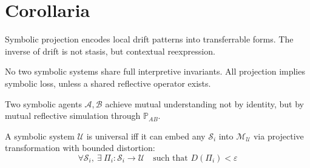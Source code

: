 \section*{Corollaria}
\label{sec:bk8_corollaria}
\begin{corollary}
\label{corollary:bk8_projective_drift}
Symbolic projection encodes local drift patterns into transferrable forms. The inverse of drift is not stasis, but contextual reexpression.
\end{corollary}
\begin{corollary}
\label{corollary:bk8_translation_limit}
No two symbolic systems share full interpretive invariants. All projection implies symbolic loss, unless a shared reflective operator exists.
\end{corollary}
\begin{corollary}
\label{corollary:bk8_resonant_cognition}
Two symbolic agents $\mathscr{A}, \mathscr{B}$ achieve mutual understanding not by identity, but by mutual reflective simulation through $\mathbb{P}_{AB}$.
\end{corollary}
\begin{corollary}
\label{corollary:bk8_universality_condition}
A symbolic system $\mathscr{U}$ is universal iff it can embed any $\mathscr{S}_i$ into $\mathcal{M}_\mathscr{U}$ via projective transformation with bounded distortion:
\[
\forall \mathscr{S}_i, \ \exists \ \Pi_i : \mathscr{S}_i \to \mathscr{U} \quad \text{such that } D(\Pi_i) < \varepsilon
\]
\end{corollary}

